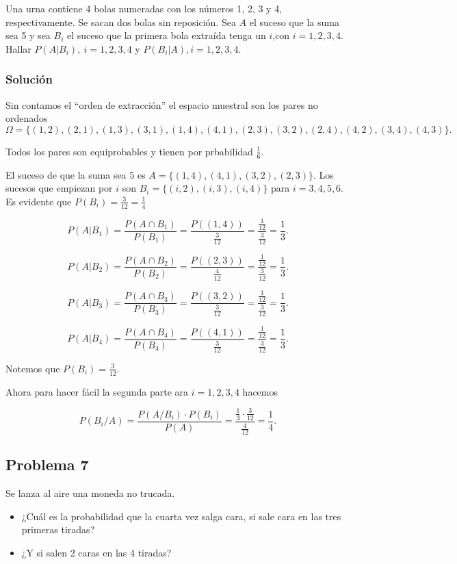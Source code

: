 \documentclass[
]{article}
\providecommand{\tightlist}{%
  \setlength{\itemsep}{0pt}\setlength{\parskip}{0pt}}
\begin{document}
Una urna contiene 4 bolas numeradas con los números 1, 2, 3 y 4,
respectivamente. Se sacan dos bolas sin reposición. Sea \(A\) el suceso
que la suma sea 5 y sea \(B_i\) el suceso que la primera bola extraída
tenga un \(i\),con \(i=1,2,3,4\). Hallar \(P(A|B_i),\  i=1,2,3,4\) y
\(P(B_i|A), i=1,2,3,4\).

\hypertarget{soluciuxf3n-6}{%
\subsubsection{Solución}\label{soluciuxf3n-6}}

Sin contamos el ``orden de extracción'' el espacio muestral son los
pares no ordenados
\[\Omega =\{(1,2),(2,1),(1,3),(3,1),(1,4),(4,1),(2,3),(3,2),(2,4),(4,2),(3,4),(4,3)\}.\]

Todos los pares son equiprobables y tienen por prbabilidad
\(\frac{1}{6}.\)

El suceso de que la suma sea 5 es \(A=\{(1,4),(4,1),(3,2),(2,3)\}\). Los
sucesos que empiezan por \(i\) son \(B_i=\{(i,2),(i,3),(i,4)\}\) para
\(i=3,4,5,6.\) Es evidente que \(P(B_i)=\frac{3}{12}=\frac{1}{4}\)

\[
P(A|B_1)=\frac{P(A\cap B_1)}{P(B_1)}=\frac{P((1,4))}{\frac{3}{12}}=
\frac{\frac{1}{12}}{\frac{3}{12}}=\frac{1}{3}.
\]

\[
P(A|B_2)=\frac{P(A\cap B_2)}{P(B_2)}=\frac{P((2,3))}{\frac{4}{12}}=
\frac{\frac{1}{12}}{\frac{3}{12}}=\frac{1}{3}.
\]

\[
P(A|B_3)=\frac{P(A\cap B_3)}{P(B_3)}=\frac{P((3,2))}{\frac{3}{12}}=
\frac{\frac{1}{12}}{\frac{3}{12}}=\frac{1}{3}.
\]

\[P(A|B_4)=\frac{P(A\cap B_4)}{P(B_4)}=\frac{P((4,1))}{\frac{3}{12}}=
\frac{\frac{1}{12}}{\frac{3}{12}}=\frac{1}{3}.\]

Notemos que \(P(B_i)=\frac{3}{12}.\)

Ahora para hacer fácil la segunda parte ara \(i=1,2,3,4\) hacemos

\[
P(B_i/A)=\frac{P(A/B_i)\cdot P(B_i)}{P(A)}=\frac{\frac{1}{3}\cdot \frac{3}{12}}{\frac{4}{12}}=\frac{1}{4}.
\]

\hypertarget{problema-7}{%
\subsection{Problema 7}\label{problema-7}}

Se lanza al aire una moneda no trucada.

\begin{itemize}
\tightlist
\item
  ¿Cuál es la probabilidad que la cuarta vez salga cara, si sale cara en
  las tres primeras tiradas?
\item
  ¿Y si salen 2 caras en las 4 tiradas?
\end{itemize}
\end{document}
